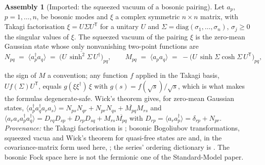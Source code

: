 \documentclass[11pt]{article}
\theoremstyle{definition}
\newtheorem{assembled}[theorem]{Assembly}
\theoremstyle{plain}
\newcommand{\changedmark}[2]{\marginpar{\raggedright\scriptsize\color{#1}#2}}
\begin{document}
\begin{assembled}[Imported: the squeezed vacuum of a bosonic pairing]\label{c:families.imported-squeezed-vacuum-bosonic-pairing}
\changedmark{gray}{reworded}
Let $a_{p}$, $p = 1, \dots, n$, be bosonic modes and $\xi$ a complex symmetric $n \times n$ matrix, with Takagi factorisation $\xi = U\Sigma U^{\mathsf{T}}$ for a unitary $U$ and $\Sigma = \mathrm{diag}(\sigma_{1}, \dots, \sigma_{n})$, $\sigma_{j} \ge 0$ the singular values of $\xi$. The squeezed vacuum of the pairing $\xi$ is the zero-mean Gaussian state whose only nonvanishing two-point functions are
\[
N_{pq} \;=\; \langle a_{p}^{\dagger}a_{q}\rangle \;=\; \overline{\bigl(U\,\sinh^{2}\!\Sigma\,U^{\dagger}\bigr)}_{pq}, \qquad
M_{pq} \;=\; \langle a_{p}a_{q}\rangle \;=\; -\bigl(U\,\sinh\Sigma\cosh\Sigma\,U^{\mathsf{T}}\bigr)_{pq},
\]

the sign of $M$ a convention; any function $f$ applied in the Takagi basis, $U f(\Sigma) U^{\mathsf{T}}$, equals $g(\xi\xi^{\dagger})\,\xi$ with $g(s) = f(\sqrt{s})/\sqrt{s}$, which is what makes the formulas degenerate-safe. Wick's theorem gives, for zero-mean Gaussian states, $\langle a_{p}^{\dagger}a_{q}^{\dagger}a_{r}a_{s}\rangle = N_{ps}N_{qr} + N_{pr}N_{qs} + \overline{M_{pq}}M_{rs}$ and $\langle a_{r}a_{s}a_{p}^{\dagger}a_{q}^{\dagger}\rangle = D_{rq}D_{sp} + D_{rp}D_{sq} + M_{rs}\overline{M_{pq}}$ with $D_{rp} = \langle a_{r}a_{p}^{\dagger}\rangle = \delta_{rp} + N_{pr}$. \emph{Provenance:} the Takagi factorisation is \cite[Cor.~4.4.4]{HornJohnson}; bosonic Bogoliubov transformations, squeezed vacua and Wick's theorem for quasi-free states are \cite[Ch.~2-3]{Berezin1966} and, in the covariance-matrix form used here, \cite[\S II]{Weedbrook2012}; the series' ordering dictionary is \cite[Thm.~5.7]{ButlerT9}. The bosonic Fock space here is not the fermionic one of the Standard-Model paper.
\end{assembled}
\end{document}
